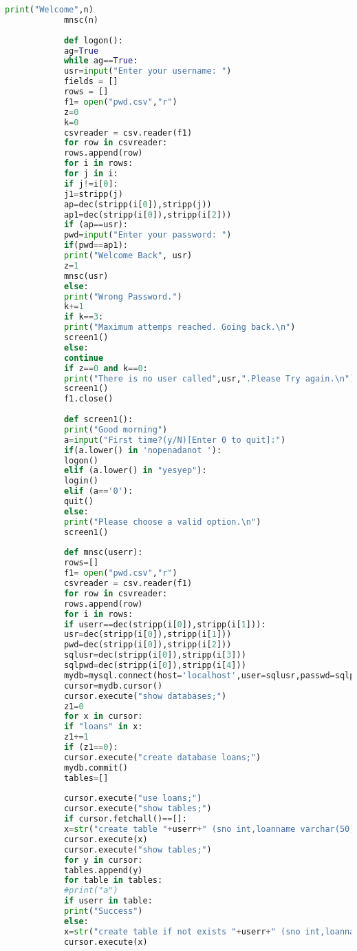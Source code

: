 \documentclass[12pt,a4paper]{article}
\begin{document}
\begin{normalsize}
\begin{lstlisting}[language=Python]
			print("Welcome",n)
			mnsc(n)
			
			def logon():
			ag=True
			while ag==True:
			usr=input("Enter your username: ")
			fields = []
			rows = []
			f1= open("pwd.csv","r")
			z=0
			k=0
			csvreader = csv.reader(f1)
			for row in csvreader:
			rows.append(row)
			for i in rows:
			for j in i:
			if j!=i[0]:
			j1=stripp(j)
			ap=dec(stripp(i[0]),stripp(j))
			ap1=dec(stripp(i[0]),stripp(i[2]))
			if (ap==usr):
			pwd=input("Enter your password: ")
			if(pwd==ap1):
			print("Welcome Back", usr)
			z=1
			mnsc(usr)
			else:
			print("Wrong Password.")
			k+=1
			if k==3:
			print("Maximum attemps reached. Going back.\n")
			screen1()
			else:
			continue
			if z==0 and k==0:
			print("There is no user called",usr,".Please Try again.\n")
			screen1()
			f1.close()
			
			def screen1():
			print("Good morning")
			a=input("First time?(y/N)[Enter 0 to quit]:")
			if(a.lower() in 'nopenadanot '):
			logon()
			elif (a.lower() in "yesyep"):
			login()
			elif (a=='0'):
			quit()
			else:
			print("Please choose a valid option.\n")
			screen1()
			
			def mnsc(userr):
			rows=[]
			f1= open("pwd.csv","r")
			csvreader = csv.reader(f1)
			for row in csvreader:
			rows.append(row)
			for i in rows:
			if userr==dec(stripp(i[0]),stripp(i[1])):
			usr=dec(stripp(i[0]),stripp(i[1]))
			pwd=dec(stripp(i[0]),stripp(i[2]))
			sqlusr=dec(stripp(i[0]),stripp(i[3]))
			sqlpwd=dec(stripp(i[0]),stripp(i[4]))
			mydb=mysql.connect(host='localhost',user=sqlusr,passwd=sqlpwd)
			cursor=mydb.cursor()
			cursor.execute("show databases;")
			z1=0
			for x in cursor:
			if "loans" in x:
			z1+=1
			if (z1==0):
			cursor.execute("create database loans;")
			mydb.commit()
			tables=[]
			
			cursor.execute("use loans;")
			cursor.execute("show tables;")
			if cursor.fetchall()==[]:
			x=str("create table "+userr+" (sno int,loanname varchar(50), loantype varchar(20),loanamt float, loandate date, months int, roi float,PRIMARY KEY(sno));")
			cursor.execute(x)
			cursor.execute("show tables;")
			for y in cursor:
			tables.append(y)	
			for table in tables:
			#print("a")
			if userr in table:
			print("Success")
			else:
			x=str("create table if not exists "+userr+" (sno int,loanname varchar(50), loantype varchar(20),loanamt float, loandate date, months int, roi float,PRIMARY KEY(sno));")
			cursor.execute(x)
			

\end{lstlisting}
\end{normalsize}
\end{document}
